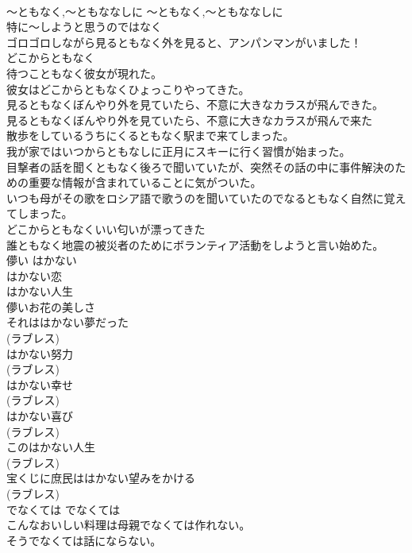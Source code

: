 \documentclass[8pt]{extreport}
\begin{document}
\begin{CJK}{UTF8}{min}
\\	〜ともなく,〜ともななしに	〜ともなく,〜ともななしに	
\\	特に〜しようと思うのではなく	
\\	ゴロゴロしながら見るともなく外を見ると、アンパンマンがいました！   
\\	どこからともなく   
\\	待つこともなく彼女が現れた。   
\\	彼女はどこからともなくひょっこりやってきた。   
\\	見るともなくぼんやり外を見ていたら、不意に大きなカラスが飛んできた。  
\\	見るともなくぼんやり外を見ていたら、不意に大きなカラスが飛んで来た   
\\	散歩をしているうちにくるともなく駅まで来てしまった。   
\\	我が家ではいつからともなしに正月にスキーに行く習慣が始まった。  
\\	目撃者の話を聞くともなく後ろで聞いていたが、突然その話の中に事件解決のための重要な情報が含まれていることに気がついた。   
\\	いつも母がその歌をロシア語で歌うのを聞いていたのでなるともなく自然に覚えてしまった。   
\\	どこからともなくいい匂いが漂ってきた   
\\	誰ともなく地震の被災者のためにボランティア活動をしようと言い始めた。   
\\	儚い	はかない	
\\	はかない恋  
\\	はかない人生  
\\	儚いお花の美しさ  
\\	それははかない夢だった   
\\	(ラブレス)
\\	はかない努力   
\\	(ラブレス)
\\	はかない幸せ   
\\	(ラブレス)
\\	はかない喜び   
\\	(ラブレス)
\\	このはかない人生   
\\	(ラブレス)
\\	宝くじに庶民ははかない望みをかける   
\\	(ラブレス)
\\	でなくては	でなくては	
\\	こんなおいしい料理は母親でなくては作れない。  
\\	そうでなくては話にならない。  

\end{CJK}
\end{document}
